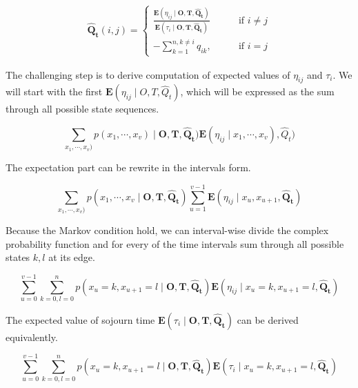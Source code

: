 \documentclass[thesis=M,english]{FITthesis}[2012/10/20]
\newcommand{\matr}[1]{\mathbf{#1}}
\begin{document}
\begin{equation}\label{eq:Qmax}
\begin{aligned}  
\matr{ \hat Q_t }(i,j)= 
\begin{cases}
\frac{ \mathbf{E}(\eta_{ij} \mid \matr{O},\matr{T}, \matr{ \hat Q_t } )}{ \mathbf{E}( \tau_i \mid \matr{O},\matr{T}, \matr{\hat Q_t} ) } & \text{if } i\neq j\\
- \sum\limits_{k=1}^{n,k \neq i} q_{ik}, \qquad & \text{if } i=j
\end{cases}
\end{aligned}
\end{equation}


The challenging step is to derive computation of expected values of $\eta_{ij}$ and $\tau_i$. We will start with the first $\mathbf{E}(\eta_{ij} \mid O,T, \hat Q_t )$, which will be expressed as the sum through all possible state sequences.

\begin{equation} 
\sum_{x_1,\cdots,x_v)} p(x_1,\cdots,x_v) \mid \matr{O},\matr{T}, \matr{ \hat Q_t }) \mathbf{E}(\eta_{ij} \mid x_1,\cdots,x_v) ,\hat Q_t )
\end{equation}

The expectation part can be rewrite in the intervals form.  

\begin{equation}
 \sum_{x_1,\cdots,x_v)} p(x_1,\cdots,x_v \mid \matr{O},\matr{T}, \matr{ \hat Q_t }) \sum_{u=1}^{v-1}\mathbf{E}(\eta_{ij} \mid x_u, x_{u+1} ,\matr{\hat Q_t} )
\end{equation}

Because the Markov condition hold, we can interval-wise divide the complex probability function and for every of the time intervals sum through all possible states $k,l$ at its edge. 

\begin{equation}
\sum_{u=0}^{v-1} \sum_{k=0,l=0}^n p( x_u = k, x_{u+1} = l \mid \matr{O},\matr{T}, \matr{ \hat Q_t }) \mathbf{E}(\eta_{ij} \mid x_u = k, x_{u+1} = l, \matr{ \hat Q_t } )
\end{equation}

The expected value of sojourn time $\mathbf{E}( \tau_i \mid \matr{O},\matr{T}, \matr{ \hat Q_t } )$ can be derived equivalently.

\begin{equation}
\sum_{u=0}^{v-1} \sum_{k=0,l=0}^n p( x_u = k, x_{u+1} = l \mid \matr{O},\matr{T}, \matr{ \hat Q_t }) \mathbf{E}(\tau_i \mid x_u = k, x_{u+1} = l,\matr{\hat Q_t} )
\end{equation}
\end{document}
